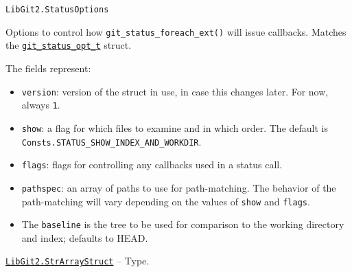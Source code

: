 \begin{adjustwidth}{2em}{0pt}


\begin{verbatim}
LibGit2.StatusOptions
\end{verbatim}

Options to control how \texttt{git\_status\_foreach\_ext()} will issue callbacks. Matches the \href{https://libgit2.org/libgit2/\#HEAD/type/git\_status\_opt\_t}{\texttt{git\_status\_opt\_t}} struct.

The fields represent:

\begin{itemize}
\item \texttt{version}: version of the struct in use, in case this changes later. For now, always \texttt{1}.


\item \texttt{show}: a flag for which files to examine and in which order. The default is \texttt{Consts.STATUS\_SHOW\_INDEX\_AND\_WORKDIR}.


\item \texttt{flags}: flags for controlling any callbacks used in a status call.


\item \texttt{pathspec}: an array of paths to use for path-matching. The behavior of the path-matching will vary depending on the values of \texttt{show} and \texttt{flags}.


\item The \texttt{baseline} is the tree to be used for comparison to the working directory and index; defaults to HEAD.

\end{itemize}


\end{adjustwidth}
\hypertarget{10686064701005230750}{}
\hyperlink{10686064701005230750}{\texttt{LibGit2.StrArrayStruct}}  -- {Type.}

